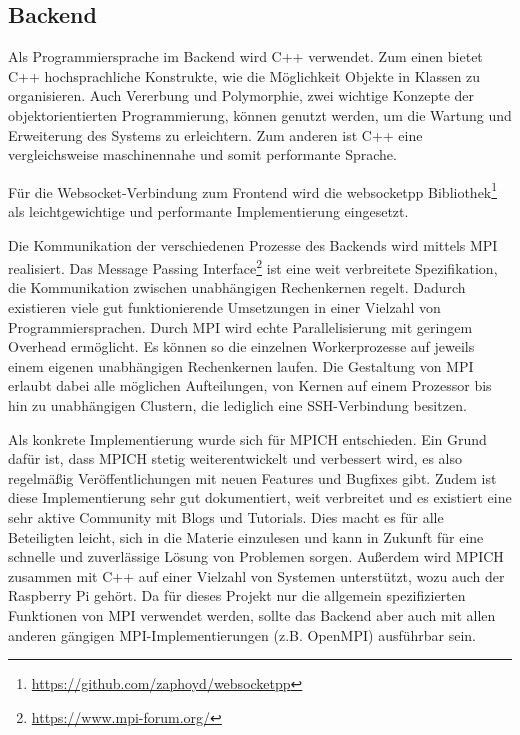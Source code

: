 \subsection{Backend}


Als Programmiersprache im Backend wird C++ verwendet. Zum einen bietet C++ hochsprachliche Konstrukte, wie die Möglichkeit Objekte in Klassen zu organisieren. Auch Vererbung und Polymorphie, zwei wichtige Konzepte der objektorientierten Programmierung, können genutzt werden, um die Wartung und Erweiterung des Systems zu erleichtern. Zum anderen ist C++ eine vergleichsweise maschinennahe und somit performante Sprache.

Für die Websocket-Verbindung zum Frontend wird die websocketpp Bibliothek\footnote{\url{https://github.com/zaphoyd/websocketpp}} als leichtgewichtige und performante Implementierung eingesetzt.

Die Kommunikation der verschiedenen Prozesse des Backends wird mittels MPI realisiert. Das Message Passing Interface\footnote{\url{https://www.mpi-forum.org/}} ist eine weit verbreitete Spezifikation, die Kommunikation zwischen unabhängigen Rechenkernen regelt. Dadurch existieren viele gut funktionierende Umsetzungen in einer Vielzahl von Programmiersprachen. Durch MPI wird echte Parallelisierung mit geringem Overhead ermöglicht. Es können so die einzelnen Workerprozesse auf jeweils einem eigenen unabhängigen Rechenkernen laufen. Die Gestaltung von MPI erlaubt dabei alle möglichen Aufteilungen, von Kernen auf einem Prozessor bis hin zu unabhängigen Clustern, die lediglich eine SSH-Verbindung besitzen.

Als konkrete Implementierung wurde sich für MPICH entschieden. Ein Grund dafür ist, dass MPICH stetig weiterentwickelt und verbessert wird, es also regelmäßig Veröffentlichungen mit neuen Features und Bugfixes gibt. Zudem ist diese Implementierung sehr gut dokumentiert, weit verbreitet und es existiert eine sehr aktive Community mit Blogs und Tutorials. Dies macht es für alle Beteiligten leicht, sich in die Materie einzulesen und kann in Zukunft für eine schnelle und zuverlässige Lösung von Problemen sorgen. Außerdem wird MPICH zusammen mit C++ auf einer Vielzahl von Systemen unterstützt, wozu auch der Raspberry Pi gehört. Da für dieses Projekt nur die allgemein spezifizierten Funktionen von MPI verwendet werden, sollte das Backend aber auch mit allen anderen gängigen MPI-Implementierungen (z.B. OpenMPI) ausführbar sein.


